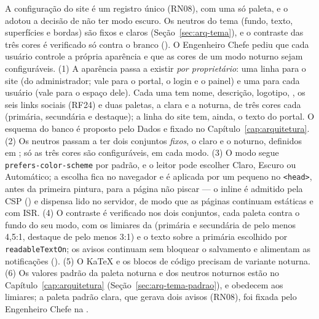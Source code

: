 {A configuração do site é um registro único (RN08), com uma só paleta, e o  adotou a decisão de não ter modo escuro. Os neutros do tema (fundo, texto, superfícies e bordas) são fixos e claros (Seção~\ref{sec:arq-tema}), e o contraste das três cores é verificado só contra o branco (). O Engenheiro Chefe pediu que cada usuário controle a própria aparência e que as cores de um modo noturno sejam configuráveis.}
{(1) A aparência passa a existir \emph{por proprietário}: uma linha para o site (do administrador; vale para o portal, o login e o painel) e uma para cada usuário (vale para o espaço dele). Cada uma tem nome, descrição, logotipo, , os seis links sociais (RF24) e duas paletas, a clara e a noturna, de três cores cada (primária, secundária e destaque); a linha do site tem, ainda, o texto do portal. O esquema do banco é proposto pelo Dados e fixado no Capítulo~\ref{cap:arquitetura}. (2) Os neutros passam a ter dois conjuntos \emph{fixos}, o claro e o noturno, definidos em ; só as três cores são configuráveis, em cada modo. (3) O modo segue \texttt{prefers-color-scheme} por padrão, e o leitor pode escolher Claro, Escuro ou Automático; a escolha fica no navegador e é aplicada por um pequeno  no \texttt{<head>}, antes da primeira pintura, para a página não piscar --- o  inline é admitido pela CSP () e dispensa  lido no servidor, de modo que as páginas continuam estáticas e com ISR. (4) O contraste é verificado nos dois conjuntos, cada paleta contra o fundo do seu modo, com os limiares da  (primária e secundária de pelo menos 4,5:1, destaque de pelo menos 3:1) e o texto sobre a primária escolhido por \texttt{readableTextOn}; os avisos continuam sem bloquear o salvamento e alimentam as notificações (). (5) O KaTeX e os blocos de código precisam de variante noturna. (6) Os valores padrão da paleta noturna e dos neutros noturnos estão no Capítulo~\ref{cap:arquitetura} (Seção~\ref{sec:arq-tema-padrao}), e obedecem aos limiares; a paleta padrão clara, que gerava dois avisos (RN08), foi fixada pelo Engenheiro Chefe na .}
